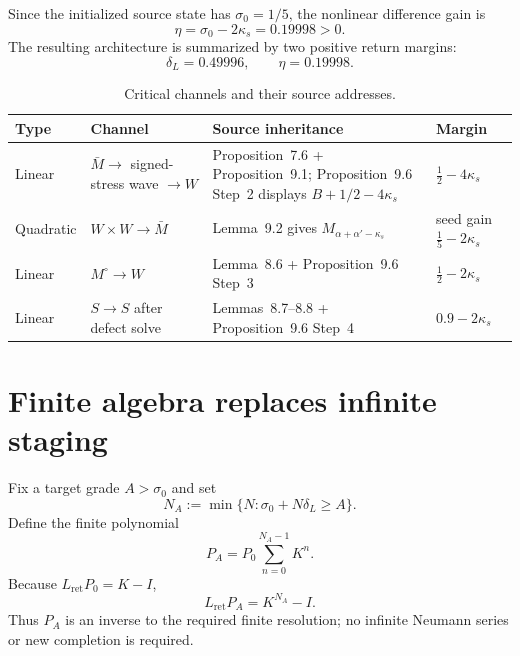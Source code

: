 \documentclass[11pt]{article}
\numberwithin{equation}{section}
\theoremstyle{highend}
\theoremstyle{definition}
\begin{document}
Since the initialized source state has $\sigma_0=1/5$, the nonlinear difference gain is
\[
\eta=\sigma_0-2\kappa_s=0.19998>0.
\]
The resulting architecture is summarized by two positive return margins:
\[
\boxed{\delta_L=0.49996,\qquad \eta=0.19998.}
\]

\begin{table}[h]
\centering
\caption{Critical channels and their source addresses.}
\label{tab:criticalchannels}
\begin{tabularx}{\textwidth}{@{}p{}p{}Xp{}@{}}
\toprule
Type & Channel & Source inheritance & Margin \\
\midrule
Linear & $\bar M\to$ signed-stress wave $\to W$ & Proposition~7.6 + Proposition~9.1; Proposition~9.6 Step~2 displays $B+1/2-4\kappa_s$ & $\frac12-4\kappa_s$ \\
Quadratic & $W\times W\to\bar M$ & Lemma~9.2 gives $M_{\alpha+\alpha'-\kappa_s}$ & seed gain $\frac15-2\kappa_s$ \\
Linear & $M^\circ\to W$ & Lemma~8.6 + Proposition~9.6 Step~3 & $\frac12-2\kappa_s$ \\
Linear & $S\to S$ after defect solve & Lemmas~8.7--8.8 + Proposition~9.6 Step~4 & $0.9-2\kappa_s$ \\
\bottomrule
\end{tabularx}
\end{table}

\section{Finite algebra replaces infinite staging}
Fix a target grade $A>\sigma_0$ and set
\[
N_A:=\min\{N:\sigma_0+N\delta_L\ge A\}.
\]
Define the finite polynomial
\begin{equation}\label{eq:PA}
P_A=P_0\sum_{n=0}^{N_A-1}K^n.
\end{equation}
Because $L_{\mathrm{ret}}P_0=K-I$,
\[
L_{\mathrm{ret}}P_A=K^{N_A}-I.
\]
Thus $P_A$ is an inverse to the required finite resolution; no infinite Neumann series or new completion is required.
\end{document}
